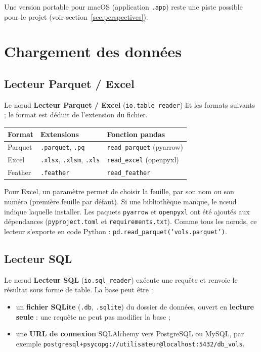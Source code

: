 \documentclass[11pt,a4paper]{article}
\newcommand{\code}[1]{\texttt{#1}}
\newcommand{\ui}[1]{\textsf{\textbf{#1}}}   %
\begin{document}
Une version portable pour macOS (application \code{.app}) reste une piste possible
pour le projet (voir section~\ref{sec:perspectives}).

\section{Chargement des données}

\subsection{Lecteur Parquet / Excel}

Le nœud \ui{Lecteur Parquet / Excel} (\code{io.table\_reader}) lit les formats
suivants ; le format est déduit de l'extension du fichier.

\begin{center}
\begin{tabular}{lll}
  \toprule
  \textbf{Format} & \textbf{Extensions} & \textbf{Fonction pandas} \\
  \midrule
  Parquet & \code{.parquet}, \code{.pq} & \code{read\_parquet} (pyarrow) \\
  Excel   & \code{.xlsx}, \code{.xlsm}, \code{.xls} & \code{read\_excel} (openpyxl) \\
  Feather & \code{.feather} & \code{read\_feather} \\
  \bottomrule
\end{tabular}
\end{center}

Pour Excel, un paramètre permet de choisir la feuille, par son nom ou son numéro
(première feuille par défaut). Si une bibliothèque manque, le nœud indique laquelle
installer. Les paquets \code{pyarrow} et \code{openpyxl} ont été ajoutés aux
dépendances (\code{pyproject.toml} et \code{requirements.txt}). Comme tous les
nœuds, ce lecteur s'exporte en code Python : \code{pd.read\_parquet('vols.parquet')}.

\subsection{Lecteur SQL}

Le nœud \ui{Lecteur SQL} (\code{io.sql\_reader}) exécute une requête et renvoie le
résultat sous forme de table. La base peut être :
\begin{itemize}
  \item un \textbf{fichier SQLite} (\code{.db}, \code{.sqlite}) du dossier de données,
        ouvert en \textbf{lecture seule} : une requête ne peut pas modifier la base ;
  \item une \textbf{URL de connexion} SQLAlchemy vers PostgreSQL ou MySQL, par exemple
        \nolinkurl{postgresql+psycopg://utilisateur@localhost:5432/db_vols}.
\end{itemize}
\end{document}
